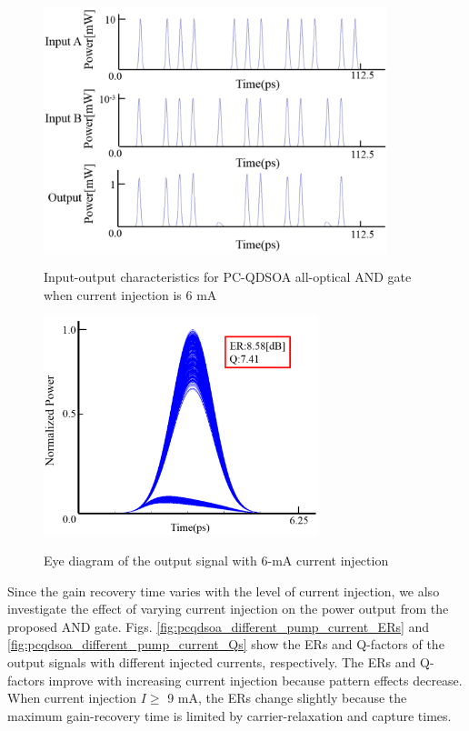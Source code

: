 \documentclass[twocolumn]{el-author}
\begin{document}
\begin{figure}[htbp]
\begin{center}
  \includegraphics[width=100mm,bb=0 0 963 685]{in-out.pdf}
  \caption{Input-output characteristics for PC-QDSOA all-optical AND gate when current injection is 6 mA}
  \label{fig:output_signal}
  \includegraphics[width=80mm,bb=0 0 712 723]{eyedia_6mA.pdf}
  \caption{Eye diagram of the output signal with 6-mA current injection}
  \label{fig:eye_dia}
\end{center}
\end{figure}
Since the gain recovery time varies with the level of current injection, we also investigate the effect of varying current injection on the power output from the proposed AND gate. Figs. {\ref{fig:pcqdsoa_different_pump_current_ERs}} and {\ref{fig:pcqdsoa_different_pump_current_Qs}} show the ERs and Q-factors of the output signals with different injected currents, respectively. The ERs and Q-factors improve with increasing current injection because pattern effects decrease. When current injection $I \geq$ 9 mA, the ERs change slightly because the maximum gain-recovery time is limited by carrier-relaxation and capture times. 
\end{document}

